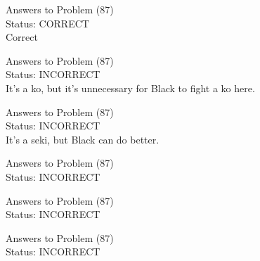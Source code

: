 \documentclass[11pt]{article}
\begin{document}
\begin{minipage}[t]{0.5\textwidth}
  {\centering
  
  Answers to Problem (87)\\
  Status: CORRECT\\
  Correct\\
  }
\end{minipage}
\begin{minipage}[t]{0.5\textwidth}
  {\centering
  
  Answers to Problem (87)\\
  Status: INCORRECT\\
  It's a ko, but it's unnecessary for Black to fight a ko here.\\
  }
\end{minipage}
\begin{minipage}[t]{0.5\textwidth}
  {\centering
  
  Answers to Problem (87)\\
  Status: INCORRECT\\
  It's a seki, but Black can do better.\\
  }
\end{minipage}
\begin{minipage}[t]{0.5\textwidth}
  {\centering
  
  Answers to Problem (87)\\
  Status: INCORRECT\\
  
  }
\end{minipage}
\begin{minipage}[t]{0.5\textwidth}
  {\centering
  
  Answers to Problem (87)\\
  Status: INCORRECT\\
  
  }
\end{minipage}
\begin{minipage}[t]{0.5\textwidth}
  {\centering
  
  Answers to Problem (87)\\
  Status: INCORRECT\\
  
  }
\end{minipage}
\end{document}
